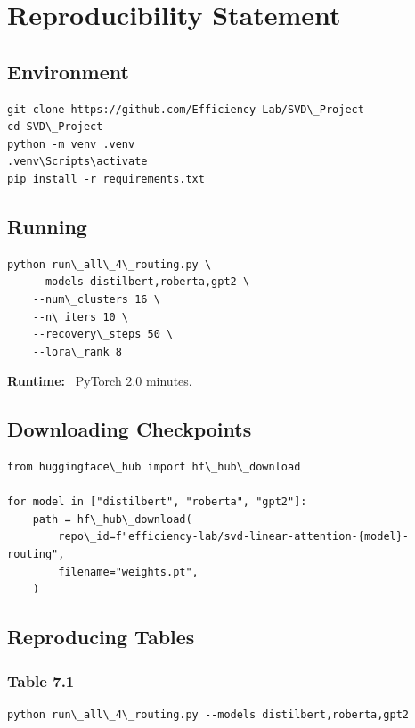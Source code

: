 
\section{Reproducibility Statement}

\subsection{Environment}

\begin{lstlisting}
git clone https://github.com/Efficiency Lab/SVD\_Project
cd SVD\_Project
python -m venv .venv
.venv\Scripts\activate
pip install -r requirements.txt
\end{lstlisting}

\subsection{Running}

\begin{lstlisting}
python run\_all\_4\_routing.py \
    --models distilbert,roberta,gpt2 \
    --num\_clusters 16 \
    --n\_iters 10 \
    --recovery\_steps 50 \
    --lora\_rank 8
\end{lstlisting}

\textbf{Runtime:} ~PyTorch 2.0 minutes.

\subsection{Downloading Checkpoints}

\begin{lstlisting}
from huggingface\_hub import hf\_hub\_download

for model in ["distilbert", "roberta", "gpt2"]:
    path = hf\_hub\_download(
        repo\_id=f"efficiency-lab/svd-linear-attention-{model}-routing",
        filename="weights.pt",
    )
\end{lstlisting}

\subsection{Reproducing Tables}

\subsubsection{Table 7.1}

\begin{lstlisting}
python run\_all\_4\_routing.py --models distilbert,roberta,gpt2
\end{lstlisting}

